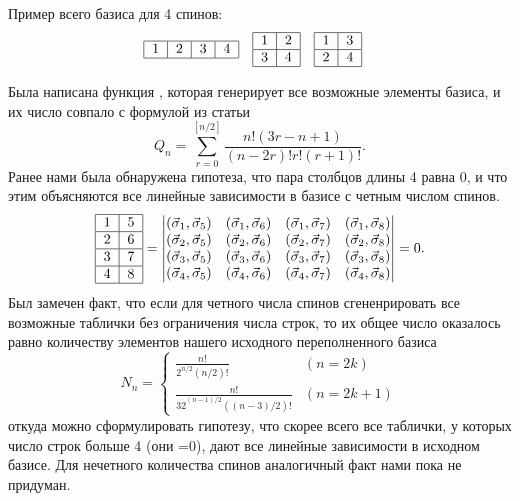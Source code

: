 \documentclass[]{article}
\renewcommand{\[}{\begin{equation}}
\renewcommand{\]}{\end{equation}}
\begin{document}
Пример всего базиса для 4 спинов:
\[
\begin{tabular}{ |l|l|l|l| }
\hline
1 & 2 & 3 & 4 \\ 
\hline
\end{tabular}
\quad	
\begin{tabular}{ |l|l| }
\hline
1 & 2 \\ \hline
3 & 4 \\
\hline
\end{tabular}
\quad	
\begin{tabular}{ |l|l| }
\hline
1 & 3 \\ \hline
2 & 4 \\
\hline
\end{tabular}
\quad	
\label{example4}
\]

Была написана функция \cite{basis_gen_code}, которая генерирует все возможные элементы базиса, и их число совпало с формулой из статьи\cite{sourceArticle}
\[
Q_n = \sum_{r=0}^{[n/2]}\frac{n!(3r-n+1)}{(n-2r)!r!(r+1)!}.
\label{k9}
\]
Ранее нами была обнаружена гипотеза, что пара столбцов длины 4 равна 0, и что этим объясняются все линейные зависимости в базисе с четным числом спинов.
\[
\begin{tabular}{ |l|l| }
\hline
1 & 5 \\ \hline
2 & 6\\ \hline
3 & 7\\ \hline
4 & 8\\
\hline
\end{tabular}
= 
\begin{vmatrix}
(\vec\sigma_1,\vec\sigma_5) & (\vec\sigma_1,\vec\sigma_6) & (\vec\sigma_1,\vec\sigma_7) & (\vec\sigma_1,\vec\sigma_8)\\
(\vec\sigma_2,\vec\sigma_5) & (\vec\sigma_2,\vec\sigma_6) & (\vec\sigma_2,\vec\sigma_7) & (\vec\sigma_2,\vec\sigma_8)\\
(\vec\sigma_3,\vec\sigma_5) & (\vec\sigma_3,\vec\sigma_6) & (\vec\sigma_3,\vec\sigma_7) & (\vec\sigma_3,\vec\sigma_8)\\
(\vec\sigma_4,\vec\sigma_5) & (\vec\sigma_4,\vec\sigma_6) & (\vec\sigma_4,\vec\sigma_7) & (\vec\sigma_4,\vec\sigma_8)\\
\end{vmatrix}
=0 .
\label{k10}
\]
Был замечен факт, что если для четного числа спинов сгененрировать все возможные таблички без ограничения числа строк,
то их общее число оказалось равно количеству элементов нашего исходного переполненного базиса
\[
N_n=\begin{cases}
\frac{n!}{2^{n/2}(n/2)!} & (n=2k)\\
\frac{n!}{3\dot 2^{(n-1)/2}((n-3)/2)!} & (n=2k+1)
\end{cases}
\label{k11}
\]
откуда можно сформулировать гипотезу, что скорее всего все таблички, у которых число строк больше 4 (они =0), дают все линейные зависимости в исходном базисе.
Для нечетного количества спинов аналогичный факт нами пока не придуман.
\end{document}
